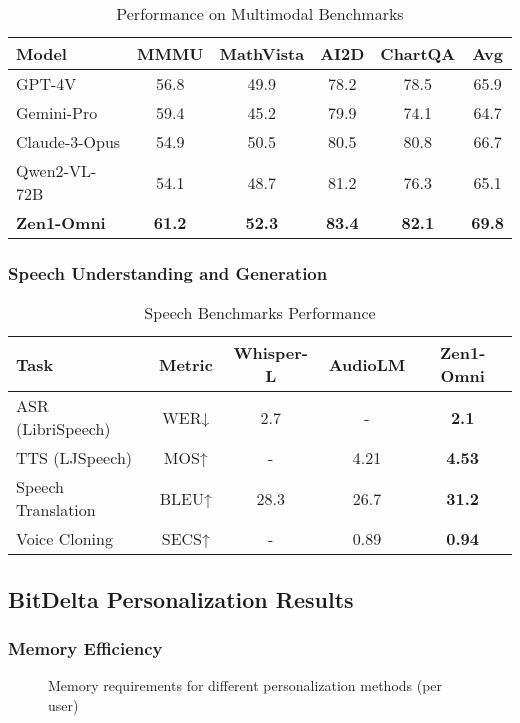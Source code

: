 \begin{table}[h]
\centering
\caption{Performance on Multimodal Benchmarks}
\begin{tabular}{lccccc}
\hline
\textbf{Model} & \textbf{MMMU} & \textbf{MathVista} & \textbf{AI2D} & \textbf{ChartQA} & \textbf{Avg} \\
\hline
GPT-4V & 56.8 & 49.9 & 78.2 & 78.5 & 65.9 \\
Gemini-Pro & 59.4 & 45.2 & 79.9 & 74.1 & 64.7 \\
Claude-3-Opus & 54.9 & 50.5 & 80.5 & 80.8 & 66.7 \\
Qwen2-VL-72B & 54.1 & 48.7 & 81.2 & 76.3 & 65.1 \\
\hline
\textbf{Zen1-Omni} & \textbf{61.2} & \textbf{52.3} & \textbf{83.4} & \textbf{82.1} & \textbf{69.8} \\
\hline
\end{tabular}
\end{table}

\subsubsection{Speech Understanding and Generation}

\begin{table}[h]
\centering
\caption{Speech Benchmarks Performance}
\begin{tabular}{lcccc}
\hline
\textbf{Task} & \textbf{Metric} & \textbf{Whisper-L} & \textbf{AudioLM} & \textbf{Zen1-Omni} \\
\hline
ASR (LibriSpeech) & WER↓ & 2.7 & - & \textbf{2.1} \\
TTS (LJSpeech) & MOS↑ & - & 4.21 & \textbf{4.53} \\
Speech Translation & BLEU↑ & 28.3 & 26.7 & \textbf{31.2} \\
Voice Cloning & SECS↑ & - & 0.89 & \textbf{0.94} \\
\hline
\end{tabular}
\end{table}

\subsection{BitDelta Personalization Results}

\subsubsection{Memory Efficiency}

\begin{figure}[h]
\centering
{}
\caption{Memory requirements for different personalization methods (per user)}
\end{figure}

